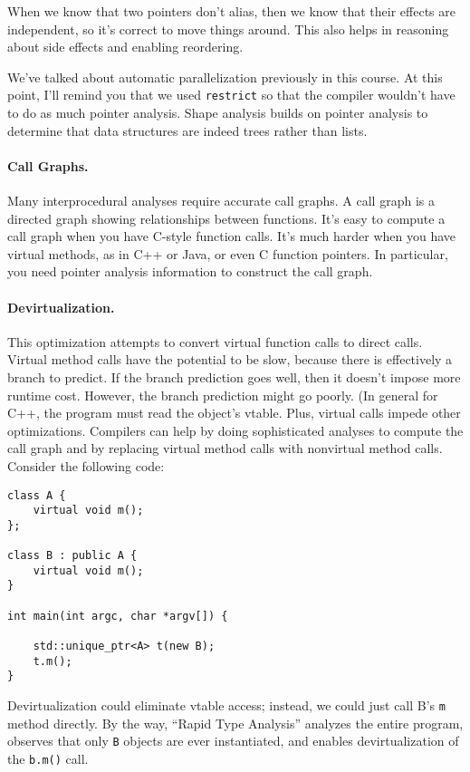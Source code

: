 When we know that two pointers don't alias, then we know that their
effects are independent, so it's correct to move things around.
This also helps in reasoning about side effects and enabling reordering.

We've talked about automatic parallelization previously in this course.
At this point, I'll remind you that we used {\tt restrict} so that the
compiler wouldn't have to do as much pointer analysis. Shape analysis
builds on pointer analysis to determine that data structures are indeed
trees rather than lists.

\paragraph{Call Graphs.} Many interprocedural analyses require accurate
call graphs. A call graph is a directed graph showing relationships between
functions. It's easy to compute a call graph when you have C-style
function calls. It's much harder when you have virtual methods, as in 
C++ or Java, or even C function pointers. In particular, you need pointer
analysis information to construct the call graph.

\paragraph{Devirtualization.} This optimization attempts to convert
virtual function calls to direct calls.  Virtual method calls have the
potential to be slow, because there is effectively a branch to
predict. If the branch prediction goes well, then it doesn't impose
more runtime cost. However, the branch prediction might go poorly.  (In
general for C++, the program must read the object's vtable. Plus, virtual
calls impede other optimizations. Compilers can help by doing
sophisticated analyses to compute the call graph and by replacing
virtual method calls with nonvirtual method calls.  Consider the
following code:
  \begin{verbatim}
class A {
    virtual void m();
};

class B : public A {
    virtual void m();
}

int main(int argc, char *argv[]) {

    std::unique_ptr<A> t(new B);
    t.m();
}
  \end{verbatim}
Devirtualization could eliminate vtable access; instead, we could just call B's {\tt m} method
directly. By the way, ``Rapid Type Analysis'' analyzes the entire program, observes that
only {\tt B} objects are ever instantiated, and enables devirtualization
of the {\tt b.m()} call.


